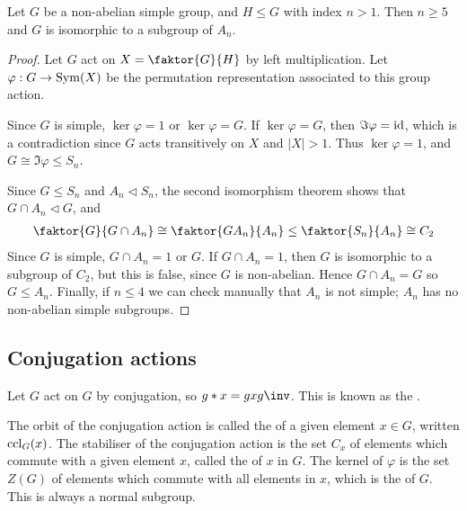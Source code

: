 \begin{theorem}
	Let $G$ be a non-abelian simple group, and $H \leq G$ with index $n > 1$.
	Then $n \geq 5$ and $G$ is isomorphic to a subgroup of $A_n$.
\end{theorem}

\begin{proof}
	Let $G$ act on $X = \faktor{G}{H}$ by left multiplication.
	Let $\varphi : G \to \operatorname{Sym}(X)$ be the permutation representation associated to this group action.

	Since $G$ is simple, $\ker \varphi = 1$ or $\ker \varphi = G$.
	If $\ker \varphi = G$, then $\Im\varphi = \operatorname{id}$, which is a contradiction since $G$ acts transitively on $X$ and $|X| > 1$.
	Thus $\ker \varphi = 1$, and $G \cong \Im\varphi \leq S_n$.

	Since $G \leq S_n$ and $A_n \triangleleft S_n$, the second isomorphism theorem shows that $G \cap A_n \triangleleft G$, and
	\begin{align*}
		\faktor{G}{G \cap A_n} \cong \faktor{GA_n}{A_n} \leq \faktor{S_n}{A_n} \cong C_2
	\end{align*}
	Since $G$ is simple, $G \cap A_n = 1$ or $G$.
	If $G \cap A_n = 1$, then $G$ is isomorphic to a subgroup of $C_2$, but this is false, since $G$ is non-abelian.
	Hence $G \cap A_n = G$ so $G \leq A_n$.
	Finally, if $n \leq 4$ we can check manually that $A_n$ is not simple; $A_n$ has no non-abelian simple subgroups.
\end{proof}

\subsection{Conjugation actions}
\begin{example}
	Let $G$ act on $G$ by conjugation, so $g \ast x = g x g\inv$.
	This is known as the .
\end{example}

\begin{definition}
	The orbit of the conjugation action is called the  of a given element $x \in G$, written $\operatorname{ccl}_G(x)$.
	The stabiliser of the conjugation action is the set $C_x$ of elements which commute with a given element $x$, called the  of $x$ in $G$.
	The kernel of $\varphi$ is the set $Z(G)$ of elements which commute with all elements in $x$, which is the  of $G$.
	This is always a normal subgroup.
\end{definition}

